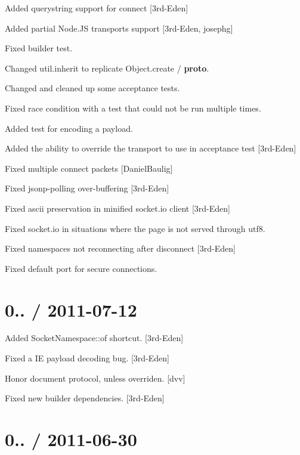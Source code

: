 \begin{DoxyItemize}
\item Added querystring support for {\ttfamily connect} \mbox{[}3rd-\/\+Eden\mbox{]}
\item Added partial Node.\+JS transports support \mbox{[}3rd-\/\+Eden, josephg\mbox{]}
\item Fixed builder test.
\item Changed {\ttfamily util.\+inherit} to replicate Object.\+create / {\bfseries proto}.
\item Changed and cleaned up some acceptance tests.
\item Fixed race condition with a test that could not be run multiple times.
\item Added test for encoding a payload.
\item Added the ability to override the transport to use in acceptance test \mbox{[}3rd-\/\+Eden\mbox{]}
\item Fixed multiple connect packets \mbox{[}Daniel\+Baulig\mbox{]}
\item Fixed jsonp-\/polling over-\/buffering \mbox{[}3rd-\/\+Eden\mbox{]}
\item Fixed ascii preservation in minified socket.\+io client \mbox{[}3rd-\/\+Eden\mbox{]}
\item Fixed socket.\+io in situations where the page is not served through utf8.
\item Fixed namespaces not reconnecting after disconnect \mbox{[}3rd-\/\+Eden\mbox{]}
\item Fixed default port for secure connections.
\end{DoxyItemize}

\section*{0.. / 2011-\/07-\/12 }


\begin{DoxyItemize}
\item Added {\ttfamily Socket\+Namespace\+::of} shortcut. \mbox{[}3rd-\/\+Eden\mbox{]}
\item Fixed a IE payload decoding bug. \mbox{[}3rd-\/\+Eden\mbox{]}
\item Honor document protocol, unless overriden. \mbox{[}dvv\mbox{]}
\item Fixed new builder dependencies. \mbox{[}3rd-\/\+Eden\mbox{]}
\end{DoxyItemize}

\section*{0.. / 2011-\/06-\/30 }


